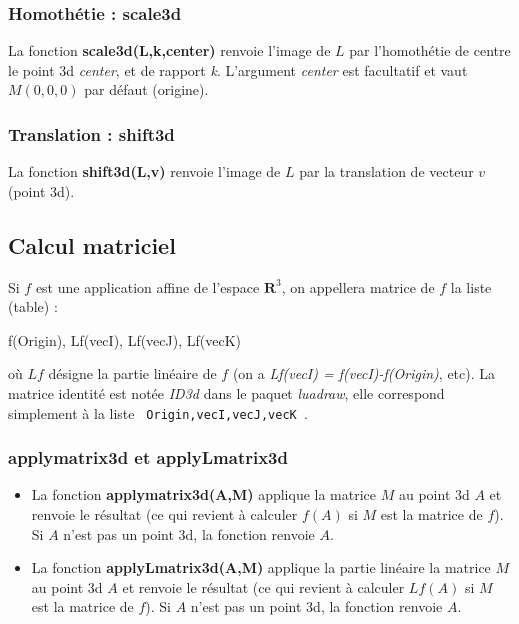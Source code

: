\documentclass[%
10pt,%
a4paper,%
french,%
]%
{article}%
\begin{document}
\subsubsection{Homothétie : scale3d}

La fonction \textbf{scale3d(L,k,center)} renvoie l'image de $L$ par l'homothétie de centre le point 3d \emph{center}, et de rapport \emph{k}. L'argument \emph{center} est facultatif et vaut $M(0,0,0)$ par défaut (origine).

\subsubsection{Translation : shift3d}

La fonction \textbf{shift3d(L,v)} renvoie l'image de $L$ par la translation de vecteur $v$ (point 3d).

\subsection{Calcul matriciel}

Si $f$ est une application affine de l'espace $\mathbf R^3$, on appellera matrice de $f$ la liste (table) :
\begin{Luacode}
{ f(Origin), Lf(vecI), Lf(vecJ), Lf(vecK) }
\end{Luacode}
où $Lf$ désigne la partie linéaire de $f$ (on a \emph{Lf(vecI) = f(vecI)-f(Origin)}, etc). La matrice identité est notée \emph{ID3d} dans le paquet \emph{luadraw}, elle correspond simplement à la liste \texttt{ {Origin,vecI,vecJ,vecK} }.

\subsubsection{applymatrix3d et applyLmatrix3d}

\begin{itemize}
    \item La fonction \textbf{applymatrix3d(A,M)} applique la matrice $M$ au point 3d $A$ et renvoie le résultat (ce qui revient à calculer $f(A)$ si $M$ est la matrice de $f$). Si $A$ n'est pas un point 3d, la fonction renvoie $A$.
    
    \item La fonction \textbf{applyLmatrix3d(A,M)} applique la partie linéaire la matrice $M$ au point 3d $A$ et renvoie le résultat (ce qui revient à calculer $Lf(A)$ si $M$ est la matrice de $f$). Si $A$ n'est pas un point 3d, la fonction renvoie $A$.
\end{itemize}
\end{document}
